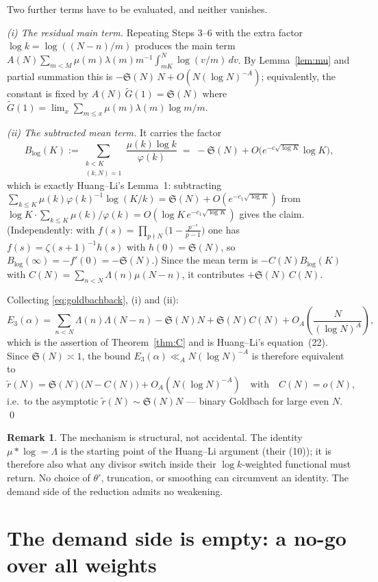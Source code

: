 \documentclass[11pt,a4paper]{article}
\theoremstyle{plain}
\theoremstyle{definition}
\newtheorem{remark}[theorem]{Remark}
\renewcommand{\SS}{\mathfrak{S}}
\begin{document}
Two further terms have to be evaluated, and neither vanishes.

\emph{(i) The residual main term.} Repeating Steps 3--6 with the extra
factor $\log k=\log((N-n)/m)$ produces the main term
$A(N)\sum_{m<M}\mu(m)\lambda(m)m^{-1}\int_{mK}^{N}\log(v/m)\,dv$. By
Lemma~\ref{lem:mu} and partial summation this is
$-\SS(N)\,N+O(N(\log N)^{-A})$; equivalently, the constant is fixed by
$A(N)\,\widetilde G(1)=\SS(N)$ where
$\widetilde G(1)=\lim_x\sum_{m\le x}\mu(m)\lambda(m)\log m/m$.

\emph{(ii) The subtracted mean term.} It carries the factor
\[
  B_{\log}(K):=\sum_{\substack{k<K\\ (k,N)=1}}\frac{\mu(k)\log k}{\varphi(k)}
  \;=\;-\SS(N)+O\bigl(e^{-c\sqrt{\log K}}\log K\bigr),
\]
which is exactly Huang--Li's Lemma~1: subtracting
$\sum_{k\le K}\mu(k)\varphi(k)^{-1}\log(K/k)=\SS(N)+O(e^{-c_1\sqrt{\log K}})$
from $\log K\cdot\sum_{k\le K}\mu(k)/\varphi(k)=O(\log K\,e^{-c_1\sqrt{\log K}})$
gives the claim. (Independently: with
$f(s)=\prod_{p\nmid N}\bigl(1-\frac{p^{-s}}{p-1}\bigr)$ one has
$f(s)=\zeta(s+1)^{-1}h(s)$ with $h(0)=\SS(N)$, so
$B_{\log}(\infty)=-f'(0)=-\SS(N)$.) Since the mean term is
$-C(N)B_{\log}(K)$ with $C(N)=\sum_{n<N}\Lambda(n)\mu(N-n)$, it
contributes $+\SS(N)\,C(N)$.

Collecting \eqref{eq:goldbachback}, (i) and (ii):
\[
  E_3(\alpha) = \sum_{n<N}\Lambda(n)\Lambda(N-n)
    -\SS(N)N+\SS(N)C(N)+O_A\!\left(\frac{N}{(\log N)^{A}}\right),
\]
which is the assertion of Theorem~\ref{thm:C} and is Huang--Li's
equation~(22). Since $\SS(N)\asymp1$, the bound
$E_3(\alpha)\ll_A N(\log N)^{-A}$ is therefore equivalent to
\[
  \tilde r(N)=\SS(N)\bigl(N-C(N)\bigr)+O_A\!\left(N(\log N)^{-A}\right)
  \quad\text{with}\quad C(N)=o(N),
\]
i.e.\ to the asymptotic $\tilde r(N)\sim\SS(N)N$ --- binary Goldbach for
large even $N$. \qed

\begin{remark}
The mechanism is structural, not accidental. The identity
$\mu*\log=\Lambda$ is the starting point of the Huang--Li argument
(their (10)); it is therefore also what any divisor switch inside their
$\log k$-weighted functional must return. No choice of $\theta'$,
truncation, or smoothing can circumvent an identity. The demand side of
the reduction admits no weakening.
\end{remark}

\section{The demand side is empty: a no-go over all weights}
\label{sec:D}
\end{document}
